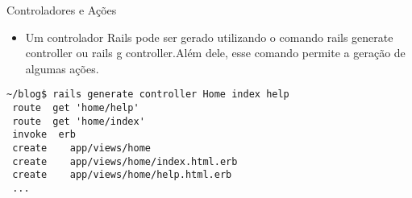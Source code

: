 \begin{frame}{Controladores e Ações}
    \begin{itemize}
      \item Um controlador Rails pode ser gerado utilizando o comando \alert{rails 
	generate controller} ou \alert{rails g controller}.Além dele, esse comando permite 
	a geração de algumas ações.
    \end{itemize}
      \begin{lstlisting}[style=BashInputStyle]
 ~/blog$ rails generate controller Home index help
 route  get 'home/help'
 route  get 'home/index'
 invoke  erb
 create    app/views/home
 create    app/views/home/index.html.erb
 create    app/views/home/help.html.erb
 ...
      \end{lstlisting}
\end{frame}

